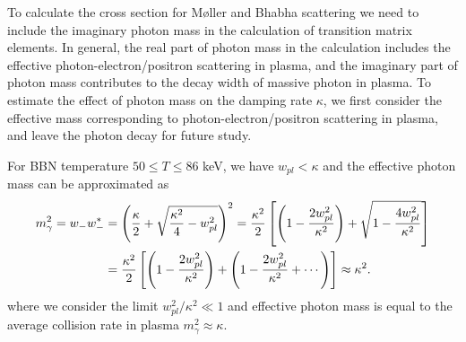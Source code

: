 To calculate the cross section for  M{\o}ller and Bhabha scattering we need to include the imaginary photon mass in the calculation of transition matrix elements. In general, the real part of photon mass in the calculation includes the effective photon-electron/positron scattering in plasma, and the imaginary part of photon mass contributes to the decay width of massive photon in plasma. To estimate the effect of photon mass on the damping rate $\kappa$, we first consider the effective mass corresponding to photon-electron/positron scattering in plasma, and leave the photon decay for future study.

For BBN temperature $50\leqslant T\leqslant 86$ keV,
we have $w_{pl}<\kappa$ and the effective photon mass can be approximated as
\begin{align}
m^2_\gamma=w_-w_-^\ast&=\left(\frac{\kappa}{2}+\sqrt{\frac{\kappa^2}{4}-w^2_{pl}}\right)^2
=\frac{\kappa^2}{2}\left[\left(1-\frac{2w^2_{pl}}{\kappa^2}\right)+\sqrt{1-\frac{4w^2_{pl}}{\kappa^2}}\right]\notag\\
&=\frac{\kappa^2}{2}\left[\left(1-\frac{2w^2_{pl}}{\kappa^2}\right)+\left(1-\frac{2w^2_{pl}}{\kappa^2}+\cdots\right)\right]\approx\kappa^2.
\label{PhotonMassPlasma002}
\end{align}
where we consider the limit $w^2_{pl}/\kappa^2\ll1$ and effective photon mass is equal to the average collision rate in plasma $m^2_\gamma\approx\kappa$.

